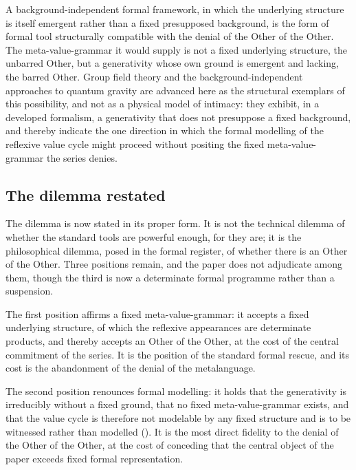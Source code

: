 \begin{claim}
A background-independent formal framework, in which the underlying structure is itself emergent rather than a fixed presupposed background, is the form of formal tool structurally compatible with the denial of the Other of the Other. The meta-value-grammar it would supply is not a fixed underlying structure, the unbarred Other, but a generativity whose own ground is emergent and lacking, the barred Other. Group field theory and the background-independent approaches to quantum gravity are advanced here as the structural exemplars of this possibility, and not as a physical model of intimacy: they exhibit, in a developed formalism, a generativity that does not presuppose a fixed background, and thereby indicate the one direction in which the formal modelling of the reflexive value cycle might proceed without positing the fixed meta-value-grammar the series denies.
\end{claim}

\subsection{The dilemma restated}
\label{p10:sec:mod-dilemma}

The dilemma is now stated in its proper form. It is not the technical dilemma of whether the standard tools are powerful enough, for they are; it is the philosophical dilemma, posed in the formal register, of whether there is an Other of the Other. Three positions remain, and the paper does not adjudicate among them, though the third is now a determinate formal programme rather than a suspension.

The first position affirms a fixed meta-value-grammar: it accepts a fixed underlying structure, of which the reflexive appearances are determinate products, and thereby accepts an Other of the Other, at the cost of the central commitment of the series. It is the position of the standard formal rescue, and its cost is the abandonment of the denial of the metalanguage.

The second position renounces formal modelling: it holds that the generativity is irreducibly without a fixed ground, that no fixed meta-value-grammar exists, and that the value cycle is therefore not modelable by any fixed structure and is to be witnessed rather than modelled (). It is the most direct fidelity to the denial of the Other of the Other, at the cost of conceding that the central object of the paper exceeds fixed formal representation.

